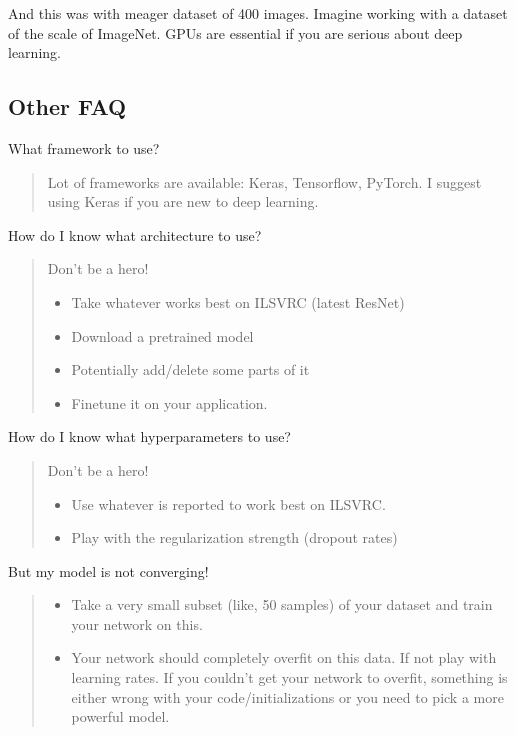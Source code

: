\documentclass[a4paper]{tufte-handout}
\begin{document}
And this was with meager dataset of 400 images. Imagine working with a
dataset of the scale of ImageNet. GPUs are essential if you are serious
about deep learning.

\subsection{Other FAQ}\label{other-faq}

\noindent What framework to use?

\begin{quote}
Lot of frameworks are available: Keras, Tensorflow, PyTorch. I suggest
using Keras if you are new to deep learning.
\end{quote}

\noindent How do I know what architecture to use?

\begin{quote}
Don't be a hero!

\begin{itemize}
\item
  Take whatever works best on ILSVRC (latest ResNet)
\item
  Download a pretrained model
\item
  Potentially add/delete some parts of it
\item
  Finetune it on your application.
\end{itemize}
\end{quote}

\noindent How do I know what hyperparameters to use?

\begin{quote}
Don't be a hero!

\begin{itemize}
\item
  Use whatever is reported to work best on ILSVRC.
\item
  Play with the regularization strength (dropout rates)
\end{itemize}
\end{quote}

\noindent But my model is not converging!

\begin{quote}
\begin{itemize}
\item
  Take a very small subset (like, 50 samples) of your dataset and train
  your network on this.
\item
  Your network should completely overfit on this data. If not play with
  learning rates. If you couldn't get your network to overfit, something
  is either wrong with your code/initializations or you need to pick a
  more powerful model.
\end{itemize}
\end{quote}
\end{document}
